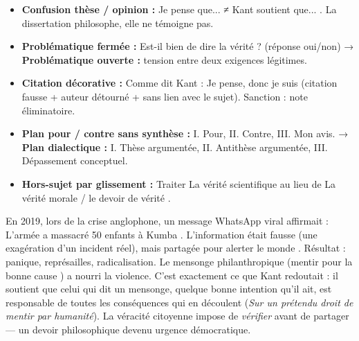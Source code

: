 \documentclass[11pt]{article}
\newcommand{\cle}[1]{{\popxbold\color{popdark}#1}}
\begin{document}
\begin{attention}
\begin{itemize}
    \item \textbf{Confusion thèse / opinion :} \guillemotleft Je pense que... \guillemotright ≠ \guillemotleft Kant soutient que... \guillemotright. La dissertation philosophe, elle ne témoigne pas.
    \item \textbf{Problématique \guillemotleft fermée \guillemotright :} \guillemotleft Est-il bien de dire la vérité ? \guillemotright (réponse oui/non) → \textbf{Problématique \guillemotleft ouverte \guillemotright :} tension entre deux exigences légitimes.
    \item \textbf{Citation \guillemotleft décorative \guillemotright :} \guillemotleft Comme dit Kant : \guillemotleft Je pense, donc je suis \guillemotright \guillemotright (citation fausse + auteur détourné + sans lien avec le sujet). Sanction : note éliminatoire.
    \item \textbf{Plan \guillemotleft pour / contre \guillemotright sans synthèse :} I. Pour, II. Contre, III. Mon avis. → \textbf{Plan dialectique :} I. Thèse argumentée, II. Antithèse argumentée, III. Dépassement conceptuel.
    \item \textbf{Hors-sujet par glissement :} Traiter \guillemotleft La vérité scientifique \guillemotright au lieu de \guillemotleft La vérité morale / le devoir de vérité \guillemotright.
\end{itemize}
\end{attention}

\begin{savaistu}
En 2019, lors de la crise anglophone, un message WhatsApp viral affirmait : \guillemotleft L'armée a massacré 50 enfants à Kumba \guillemotright. L'information était fausse (une exagération d'un incident réel), mais partagée \guillemotleft pour alerter le monde \guillemotright. Résultat : panique, représailles, radicalisation. Le \guillemotleft mensonge philanthropique \guillemotright (mentir pour la \guillemotleft bonne cause \guillemotright) a nourri la violence. C'est exactement ce que Kant redoutait : il soutient que \guillemotleft celui qui dit un mensonge, quelque bonne intention qu'il ait, est responsable de toutes les conséquences qui en découlent \guillemotright (\emph{Sur un prétendu droit de mentir par humanité}). La \cle{véracité citoyenne} impose de \emph{vérifier} avant de partager — un devoir philosophique devenu urgence démocratique.
\end{savaistu}
\end{document}
